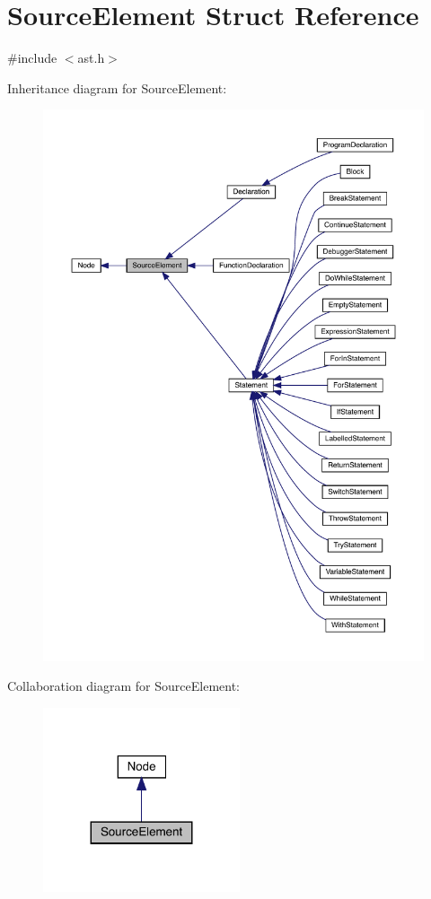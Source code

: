 \hypertarget{struct_source_element}{}\section{Source\+Element Struct Reference}
\label{struct_source_element}


{\ttfamily \#include $<$ast.\+h$>$}



Inheritance diagram for Source\+Element\+:\nopagebreak
\begin{figure}[H]
\begin{center}
\leavevmode
\includegraphics[width=350pt]{struct_source_element__inherit__graph}
\end{center}
\end{figure}


Collaboration diagram for Source\+Element\+:\nopagebreak
\begin{figure}[H]
\begin{center}
\leavevmode
\includegraphics[width=164pt]{struct_source_element__coll__graph}
\end{center}
\end{figure}
